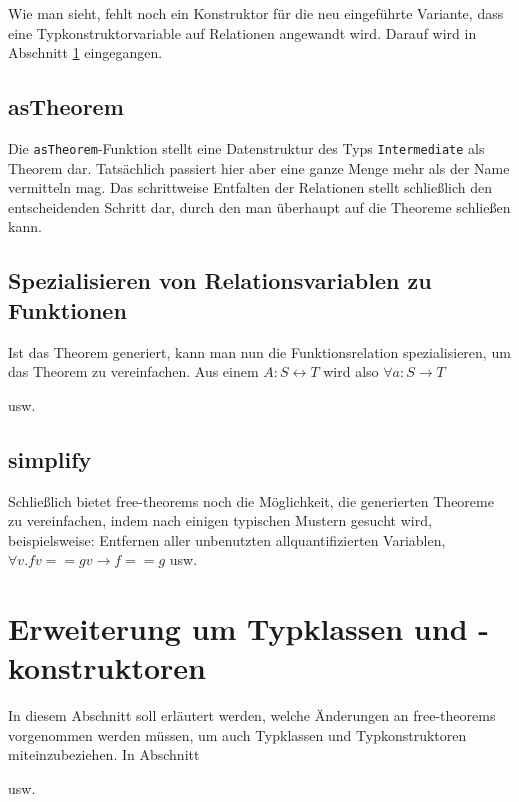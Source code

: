 \documentclass[11pt]{article} %
\begin{document}
Wie man sieht, fehlt noch ein Konstruktor für die neu eingeführte Variante, dass eine Typkonstruktorvariable auf Relationen
angewandt wird. Darauf wird in Abschnitt \ref{sec:erweiterung-typklassen} eingegangen.

\subsection{asTheorem}

Die \texttt{asTheorem}-Funktion stellt eine Datenstruktur des Typs \texttt{Intermediate} als Theorem dar. Tatsächlich passiert hier aber eine ganze Menge mehr als der Name
vermitteln mag. Das schrittweise Entfalten  der Relationen stellt schließlich den entscheidenden Schritt dar, durch den man überhaupt auf
die Theoreme schließen kann.


\subsection{Spezialisieren von Relationsvariablen zu Funktionen}

Ist das Theorem generiert, kann man nun die Funktionsrelation spezialisieren, um das Theorem zu vereinfachen. Aus einem
$A : S \leftrightarrow T$ wird also $\forall a : S \rightarrow T$

usw.

\subsection{simplify}

Schließlich bietet free-theorems noch die Möglichkeit, die generierten Theoreme zu vereinfachen, indem nach einigen typischen
Mustern gesucht wird, beispielsweise: Entfernen aller unbenutzten allquantifizierten Variablen, $\forall v. f v == g v \rightarrow f == g$ usw.

\section{Erweiterung um Typklassen und -konstruktoren}
\label{sec:erweiterung-typklassen}

In diesem Abschnitt soll erläutert werden, welche Änderungen an free-theorems vorgenommen werden müssen, um auch Typklassen und Typkonstruktoren miteinzubeziehen. In
Abschnitt 

usw.
\end{document}
